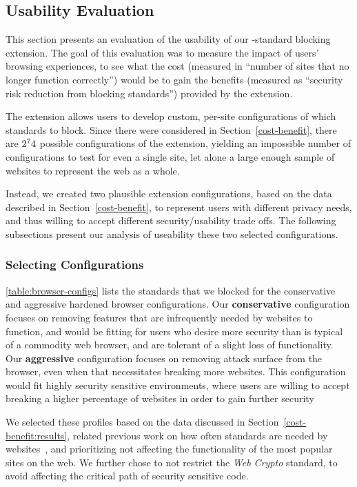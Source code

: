 \subsection{Usability Evaluation}
This section presents an evaluation of the usability of our \WAPI-standard
blocking extension.  The goal of this evaluation was to measure the impact
of users' browsing experiences, to see what the cost (measured in ``number
of sites that no longer function correctly'') would be to gain the benefits
(measured as ``security risk reduction from blocking \WAPI standards'') provided
by the extension.

The extension allows users to develop custom, per-site configurations of
which \WAPI standards to block.  Since there were \NumStandards considered in
Section~\ref{cost-benefit}, there are \(2^74\) possible configurations
of the extension, yielding an impossible number of configurations to test
for even a single site, let alone a large enough sample of websites to
represent the web as a whole.

Instead, we created two plausible extension configurations, based on the data
described in Section~\ref{cost-benefit}, to represent users with different
privacy needs, and thus willing to accept different security/usability trade offs.
The following subsections present our analysis of useability these two selected
configurations.


\subsubsection{Selecting Configurations}
\label{current-web:extension:configurations}



\ref{table:browser-configs} lists the standards that we blocked for
the conservative and aggressive hardened browser configurations.
Our \textbf{conservative} configuration focuses on removing features that are
infrequently needed by websites to function, and would be fitting for users who desire more
security than is typical of a commodity web browser, and are tolerant of a
slight loss of functionality.  Our \textbf{aggressive} configuration focuses on removing
attack surface from the browser, even when that necessitates breaking more websites.
This configuration would fit highly security sensitive environments, where users
are willing to accept breaking a higher percentage of websites in order to gain further security

We selected these profiles based on the data discussed in Section~\ref{cost-benefit:results}, related
previous work on how often standards are needed by websites~\cite{snyder2016browser},
and prioritizing not affecting the functionality of the most popular sites on the
web.  We further chose to not restrict the \emph{Web Crypto} standard, to
avoid affecting the critical path of security sensitive code.

